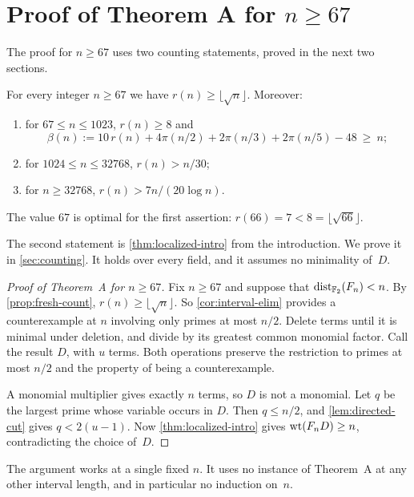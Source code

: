 \section{Proof of Theorem A for \texorpdfstring{$n\ge67$}{n >= 67}}\label{sec:assembly}

The proof for $n\ge67$ uses two counting statements, proved in the next two sections.

\begin{proposition}\label{prop:fresh-count}
For every integer $n\ge67$ we have $r(n)\ge\lfloor\sqrt n\rfloor$. Moreover:
\begin{enumerate}[label=\textup{(\alph*)}]
\item for $67\le n\le1023$, $r(n)\ge8$ and
\[
 \beta(n):=10\,r(n)+4\pi(n/2)+2\pi(n/3)+2\pi(n/5)-48\ \ge\ n;
\]
\item for $1024\le n\le32768$, $r(n)>n/30$;
\item for $n\ge32768$, $r(n)>7n/(20\log n)$.
\end{enumerate}
\end{proposition}

The value $67$ is optimal for the first assertion: $r(66)=7<8=\lfloor\sqrt{66}\rfloor$.

The second statement is \cref{thm:localized-intro} from the introduction. We prove it in \cref{sec:counting}. It holds over every field, and it assumes no minimality of~$D$.

\begin{proof}[Proof of Theorem~A for $n\ge67$]
Fix $n\ge67$ and suppose that $\operatorname{dist}_{\mathbb{F}_2}(F_n)<n$. By \cref{prop:fresh-count}, $r(n)\ge\lfloor\sqrt n\rfloor$. So \cref{cor:interval-elim} provides a counterexample at $n$ involving only primes at most $n/2$. Delete terms until it is minimal under deletion, and divide by its greatest common monomial factor. Call the result $D$, with $u$ terms. Both operations preserve the restriction to primes at most $n/2$ and the property of being a counterexample.

A monomial multiplier gives exactly $n$ terms, so $D$ is not a monomial. Let $q$ be the largest prime whose variable occurs in $D$. Then $q\le n/2$, and \cref{lem:directed-cut} gives $q<2(u-1)$. Now \cref{thm:localized-intro} gives $\operatorname{wt}(F_nD)\ge n$, contradicting the choice of~$D$.
\end{proof}

\begin{remark}
The argument works at a single fixed $n$. It uses no instance of Theorem~A at any other interval length, and in particular no induction on~$n$.
\end{remark}
